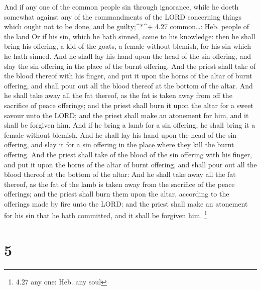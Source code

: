  And if any one of the common people sin through ignorance,
while he doeth somewhat against any of the commandments of the LORD
concerning things which ought not to be done, and be guilty;\^{}*\^{}+
4.27 common\ldots: Heb. people of the land  Or if his sin,
which he hath sinned, come to his knowledge: then he shall bring his
offering, a kid of the goats, a female without blemish, for his sin
which he hath sinned.  And he shall lay his hand upon the
head of the sin offering, and slay the sin offering in the place of the
burnt offering.  And the priest shall take of the blood
thereof with his finger, and put it upon the horns of the altar of burnt
offering, and shall pour out all the blood thereof at the bottom of the
altar.  And he shall take away all the fat thereof, as the
fat is taken away from off the sacrifice of peace offerings; and the
priest shall burn it upon the altar for a sweet savour unto the LORD;
and the priest shall make an atonement for him, and it shall be forgiven
him.  And if he bring a lamb for a sin offering, he shall
bring it a female without blemish.  And he shall lay his
hand upon the head of the sin offering, and slay it for a sin offering
in the place where they kill the burnt offering.  And the
priest shall take of the blood of the sin offering with his finger, and
put it upon the horns of the altar of burnt offering, and shall pour out
all the blood thereof at the bottom of the altar:  And he
shall take away all the fat thereof, as the fat of the lamb is taken
away from the sacrifice of the peace offerings; and the priest shall
burn them upon the altar, according to the offerings made by fire unto
the LORD: and the priest shall make an atonement for his sin that he
hath committed, and it shall be forgiven him. \footnote{4.27 any one:
  Heb. any soul}

\hypertarget{section-4}{%
\section{5}\label{section-4}}

